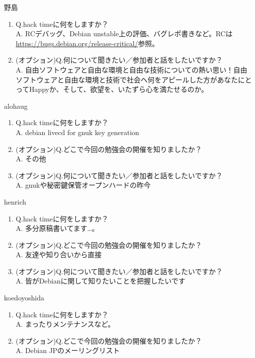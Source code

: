 \begin{prework}{ 野島 }
  \begin{enumerate}
  \item Q.hack timeに何をしますか？\\
    A. RCデバッグ、Debian unstable上の評価、バグレポ書きなど。RCは\url{https://bugs.debian.org/release-critical/}参照。
  \item (オプション)Q.何について聞きたい／参加者と話をしたいですか？\\
    A. 自由ソフトウェアと自由な環境と自由な技術についての熱い思い！自由ソフトウェアと自由な環境と技術で社会へ何をアピールした方があなたにとってHappyか、そして、欲望を、いたずら心を満たせるのか。
  \end{enumerate}
\end{prework}

\begin{prework}{ alohaug }
  \begin{enumerate}
  \item Q.hack timeに何をしますか？\\
    A. debian livecd for gnuk key generation
  \item (オプション)Q.どこで今回の勉強会の開催を知りましたか？\\
    A. その他
  \item (オプション)Q.何について聞きたい／参加者と話をしたいですか？\\
    A. gnukや秘密鍵保管オープンハードの昨今
  \end{enumerate}
\end{prework}

\begin{prework}{ henrich }
  \begin{enumerate}
  \item Q.hack timeに何をしますか？\\
    A. 多分原稿書いてます…。
  \item (オプション)Q.どこで今回の勉強会の開催を知りましたか？\\
    A. 友達や知り合いから直接
  \item (オプション)Q.何について聞きたい／参加者と話をしたいですか？\\
    A. 皆がDebianに関して知りたいことを把握したいです
  \end{enumerate}
\end{prework}

\begin{prework}{ koedoyoshida }
  \begin{enumerate}
  \item Q.hack timeに何をしますか？\\
    A. まったりメンテナンスなど。
  \item (オプション)Q.どこで今回の勉強会の開催を知りましたか？\\
    A. Debian JPのメーリングリスト
  \end{enumerate}
\end{prework}

